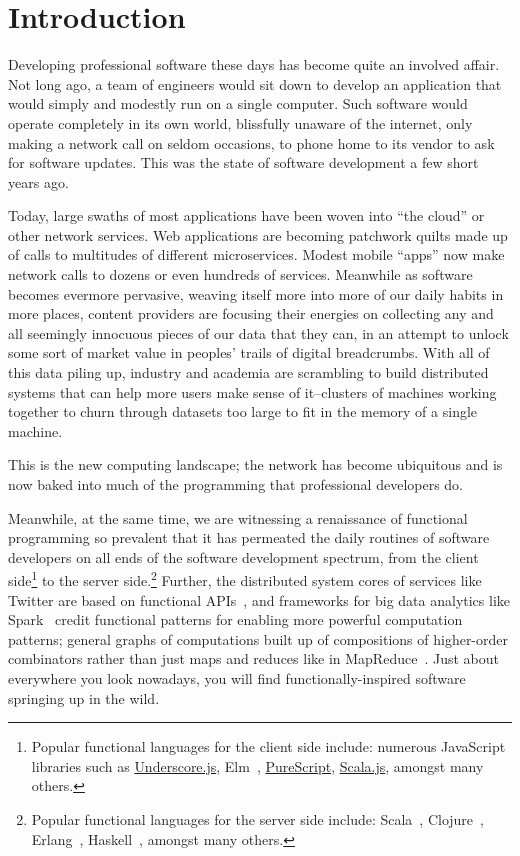 \chapter{Introduction}

Developing professional software these days has become quite an involved affair.
Not long ago, a team of engineers would sit down to develop an application that
would simply and modestly run on a single computer. Such software would operate
completely in its own world, blissfully unaware of the internet, only making a
network call on seldom occasions, \eg to phone home to its vendor to ask for
software updates. This was the state of software development a few short years
ago.


Today, large swaths of most applications have been woven into ``the cloud'' or
other network services. Web applications are becoming patchwork quilts made up
of calls to multitudes of different microservices. Modest mobile ``apps'' now make
network calls to dozens or even hundreds of services. Meanwhile as software
becomes evermore pervasive, weaving itself more into more of our daily habits in
more places, content providers are focusing their energies on collecting any and
all seemingly innocuous pieces of our data that they can, in an attempt to
unlock some sort of market value in peoples' trails of digital breadcrumbs. With
all of this data piling up, industry and academia are scrambling to build
distributed systems that can help more users make sense of it--clusters of
machines working together to churn through datasets too large to fit in the
memory of a single machine.

This is the new computing landscape; the network has become ubiquitous and is
now baked into much of the programming that professional developers do.

Meanwhile, at the same time, we are witnessing a renaissance of functional
programming so prevalent that it has permeated the daily routines of software
developers on all ends of the software development spectrum, from the
client side\footnote{Popular functional languages for the client side include:
numerous JavaScript libraries such as
\href{http://underscorejs.org}{Underscore.js}, Elm~\cite{Elm},
\href{http://www.purescript.org/}{PureScript},
\href{http://www.scala-js.org/}{Scala.js}, amongst many others.} to the
server side.\footnote{Popular functional languages for the server side include:
Scala~\cite{Odersky10}, Clojure~\cite{Clojure}, Erlang~\cite{Erlang},
Haskell~\cite{Haskell}, amongst many others.} Further, the distributed system
cores of services like Twitter are based on functional APIs~\cite{Eriksen2013},
and frameworks for big data analytics like Spark~\cite{Spark} credit functional
patterns for enabling more powerful computation patterns; \ie general graphs of
computations built up of compositions of higher-order combinators rather than just
maps and reduces like in MapReduce~\cite{MateiScalaByTheBay}. Just about
everywhere you look nowadays, you will find functionally-inspired software
springing up in the wild.


